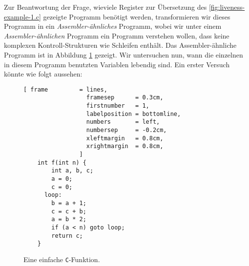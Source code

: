 Zur Beantwortung der Frage, wieviele Register  zur \"Ubersetzung des \ref{fig:liveness-example-1.c}
gezeigte Programm ben\"otigt werden, transformieren wir dieses Programm in ein 
\emph{Assembler-\"ahnliches} Programm, wobei wir unter einem \emph{Assembler-\"ahnlichen} Programm ein
Programm verstehen wollen, dass keine komplexen Kontroll-Strukturen wie Schleifen enth\"alt.
Das Assembler-\"ahnliche Programm ist in Abbildung \ref{fig:liveness-example-1-asm.c} gezeigt.  Wir
untersuchen nun, wann die einzelnen in diesem Programm benutzten Variablen lebendig sind.  Ein erster Versuch
k\"onnte wie folgt aussehen:

\begin{figure}[!ht]
\centering
\begin{Verbatim}[ frame         = lines, 
                  framesep      = 0.3cm, 
                  firstnumber   = 1,
                  labelposition = bottomline,
                  numbers       = left,
                  numbersep     = -0.2cm,
                  xleftmargin   = 0.8cm,
                  xrightmargin  = 0.8cm,
                ]
    int f(int n) {
        int a, b, c;
        a = 0;
        c = 0;
      loop:
        b = a + 1;
        c = c + b;
        a = b * 2;
        if (a < n) goto loop;
        return c;
    }
\end{Verbatim}
\vspace*{-0.3cm}
\caption{Eine einfache \texttt{C}-Funktion.}
\label{fig:liveness-example-1-asm.c}
\end{figure}


